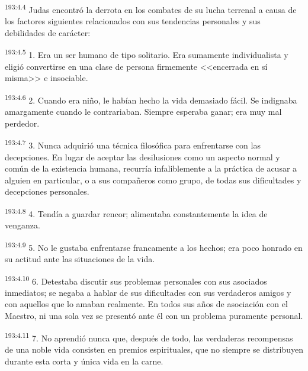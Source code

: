 \par 
\textsuperscript{193:4.4} Judas encontró la derrota en los combates de su lucha terrenal a causa de los factores siguientes relacionados con sus tendencias personales y sus debilidades de carácter:

\par 
\textsuperscript{193:4.5} 1. Era un ser humano de tipo solitario. Era sumamente individualista y eligió convertirse en una clase de persona firmemente <<encerrada en sí misma>> e insociable.

\par 
\textsuperscript{193:4.6} 2. Cuando era niño, le habían hecho la vida demasiado fácil. Se indignaba amargamente cuando le contrariaban. Siempre esperaba ganar; era muy mal perdedor.

\par 
\textsuperscript{193:4.7} 3. Nunca adquirió una técnica filosófica para enfrentarse con las decepciones. En lugar de aceptar las desilusiones como un aspecto normal y común de la existencia humana, recurría infaliblemente a la práctica de acusar a alguien en particular, o a sus compañeros como grupo, de todas sus dificultades y decepciones personales.

\par 
\textsuperscript{193:4.8} 4. Tendía a guardar rencor; alimentaba constantemente la idea de venganza.

\par 
\textsuperscript{193:4.9} 5. No le gustaba enfrentarse francamente a los hechos; era poco honrado en su actitud ante las situaciones de la vida.

\par 
\textsuperscript{193:4.10} 6. Detestaba discutir sus problemas personales con sus asociados inmediatos; se negaba a hablar de sus dificultades con sus verdaderos amigos y con aquellos que lo amaban realmente. En todos sus años de asociación con el Maestro, ni una sola vez se presentó ante él con un problema puramente personal.

\par 
\textsuperscript{193:4.11} 7. No aprendió nunca que, después de todo, las verdaderas recompensas de una noble vida consisten en premios espirituales, que no siempre se distribuyen durante esta corta y única vida en la carne.

